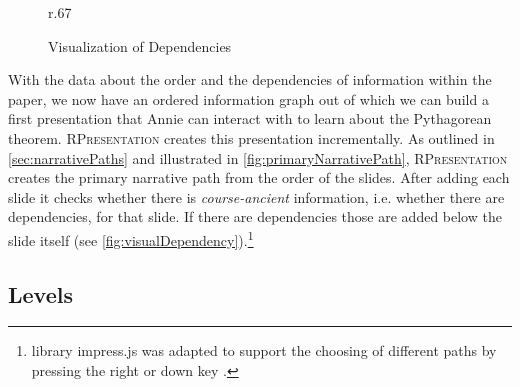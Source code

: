 \documentclass{llncs}
\newcommand{\sys}{\textsc{RPresentation}\xspace}
\begin{document}
\begin{figure}r{.67\textwidth}\vspace{-2em}
  \vspace{-1em}
  \caption{Visualization of Dependencies}\label{fig:visualDependency}
  \vspace{-2em}
\end{figure}
With the data about the order and the dependencies of information within the paper, we now
have an ordered information graph out of which we can build a first presentation that
Annie can interact with to learn about the Pytha\-go\-rean theorem. \sys creates this
presentation incrementally. As outlined in \autoref{sec:narrativePaths} and illustrated in
\autoref{fig:primaryNarrativePath}, \sys creates the primary narrative path from the order
of the slides. After adding each slide it checks whether there is \textit{course-ancient}
information, i.e. whether there are dependencies, for that slide. If there are
dependencies those are added below the slide itself (see
\autoref{fig:visualDependency}).\footnote{library impress.js was adapted to support the
  choosing of different paths by pressing the right or down key
  \cite{npentrel:npentrel15}.}


\subsection{Levels}
\label{sec:levels}
\end{document}
